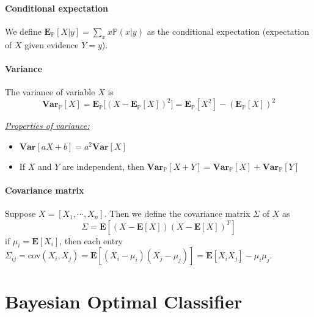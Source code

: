 \documentclass[12pt]{article}
\renewcommand{\P}{\mathbb{P}}
\newcommand{\E}{\bm{E}}
\newcommand{\Var}{\bm{Var}}
\theoremstyle{definition}
\begin{document}
\paragraph{Conditional expectation} We define $\E_{\P}[X|y]=\sum_{x}x\P(x|y)$ as the conditional expectation (expectation of $X$ given evidence $Y=y$).

\paragraph{Variance} The variance of variable $X$ is
\begin{equation}
  \Var_{\P}[X]=\E_{\P}\Big[(X-\E_{\P}[X])^2\Big]=\E_{\P}[X^2]-(\E_{\P}[X])^2
\end{equation}

\underline{\textit{Properties of variance:}}
\begin{itemize}
  \item $\Var[aX+b]=a^2\Var[X]$
  \item If $X$ and $Y$ are independent, then $\Var_\P[X+Y]=\Var_\P[X]+\Var_\P[Y]$
\end{itemize}

\paragraph{Covariance matrix} Suppose $X=[X_1,\cdots,X_n]$. Then we define the covariance matrix $\Sigma$ of $X$ as
\begin{equation}
  \Sigma=\E[(X-\E[X])(X-\E[X])^T]
\end{equation}
if $\mu_i=\E[X_i]$, then each entry $\Sigma_{ij}=\text{cov}(X_i, X_j)=\E[(X_i-\mu_i)(X_j-\mu_j)]=\E[X_iX_j]-\mu_i\mu_j$.


\section{Bayesian Optimal Classifier}
\end{document}
